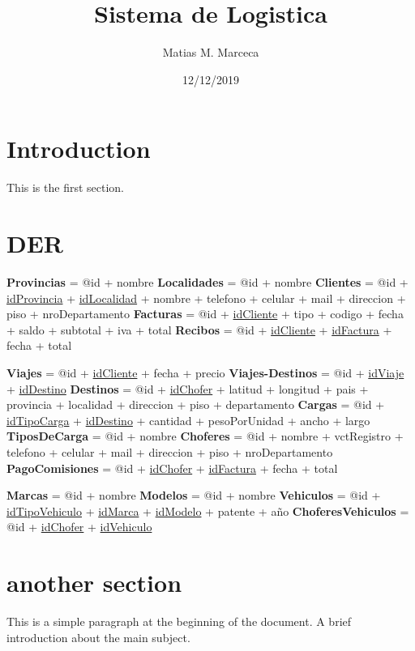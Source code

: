 \documentclass{article}
\title{Sistema de Logistica}
\author{Matias M. Marceca}
\date{12/12/2019}
\begin{document}
\maketitle

\tableofcontents

\section{Introduction}

This is the first section.

\section{DER}

  

  \begin{Diccionario de Datos}
   \textbf{Provincias}          = @id + nombre
   \textbf{Localidades}         = @id + nombre
   \textbf{Clientes}            = @id + \underline{idProvincia} + \underline{idLocalidad} + nombre + telefono + celular + mail + direccion + piso + nroDepartamento
   \textbf{Facturas}            = @id + \underline{idCliente} + tipo + codigo + fecha + saldo + subtotal + iva + total %
   \textbf{Recibos}             = @id + \underline{idCliente} + \underline{idFactura} + fecha + total

   \textbf{Viajes}              = @id + \underline{idCliente} + fecha + precio
   \textbf{Viajes-Destinos}     = @id + \underline{idViaje} + \underline{idDestino}
   \textbf{Destinos}            = @id + \underline{idChofer} + latitud + longitud + pais + provincia + localidad + direccion + piso + departamento
   \textbf{Cargas}              = @id + \underline{idTipoCarga} + \underline{idDestino} + cantidad + pesoPorUnidad + ancho + largo
   \textbf{TiposDeCarga}        = @id + nombre
   \textbf{Choferes}            = @id + nombre + vctRegistro + telefono + celular + mail + direccion + piso + nroDepartamento
   \textbf{PagoComisiones}      = @id + \underline{idChofer} + \underline{idFactura} + fecha + total

   \textbf{Marcas}              = @id + nombre
   \textbf{Modelos}             = @id + nombre
   \textbf{Vehiculos}           = @id + \underline{idTipoVehiculo} + \underline{idMarca} + \underline{idModelo} + patente + año
   \textbf{ChoferesVehiculos}   = @id + \underline{idChofer} + \underline{idVehiculo}

  \end{Diccionario de Datos}

\section{another section}

This is a simple paragraph at the beginning of the
document. A brief introduction about the main subject.
\end{document}
